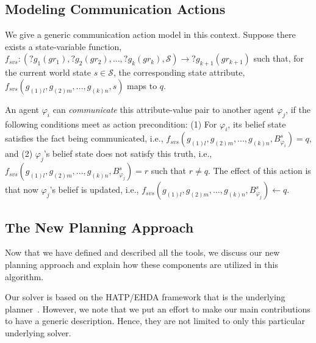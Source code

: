 \documentclass[letterpaper]{article} %
\begin{document}
\subsection{Modeling Communication Actions}
We give a generic communication action model in this context. 
% 
Suppose there exists a state-variable function, $f_{svs}:(?g_1 (gr_1), ?g_2 (gr_2), ..., ?g_k (gr_k),\mathcal{S}) \rightarrow ?g_{k+1} (gr_{k+1})$ such that,
for the current world state $s \in \mathcal{S}$, the corresponding state attribute, $f_{\textit{svs}}(g_{(1)l},g_{(2)m},...,g_{(k)n},s)$ maps to $q$.

An agent $\varphi_i$ can \textit{communicate} this attribute-value pair to another agent $\varphi_j$, if the following conditions meet as action precondition: 
(1) For $\varphi_i$, its belief state satisfies the fact being communicated, i.e.,
$f_{\textit{svs}}(g_{(1)l},g_{(2)m},...,g_{(k)n},B_{\varphi_i}^s) = q$, and (2) $\varphi_j$'s belief state does not satisfy this truth, i.e., $f_{\textit{svs}}(g_{(1)l},g_{(2)m},...,g_{(k)n},B_{\varphi_j}^s) = r$ such that $r \neq q$.
The effect of this action is that now 
$\varphi_j$'s belief is updated, i.e., $f_{\textit{svs}}(g_{(1)l},g_{(2)m},...,g_{(k)n},B_{\varphi_j}^s) \leftarrow q$. 

% 



\subsection{The New Planning Approach}
Now that we have defined and described all the tools, we discuss our new planning approach and explain how these components are utilized in this algorithm. 

Our solver is based on the HATP/EHDA framework that is the underlying planner~\cite{buisan:hal-03684211}. However, we note that we put an effort to make our main contributions to have a generic description. Hence, they are not limited to only this particular underlying solver. 
\end{document}
